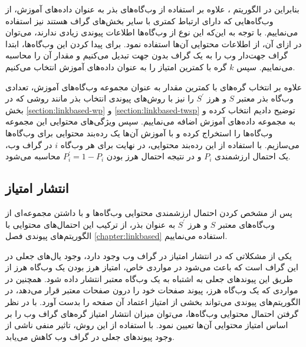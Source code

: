 \documentclass[twoside, a4paper,11pt]{book}
\numberwithin{equation}{chapter}
\numberwithin{table}{chapter}
\numberwithin{figure}{chapter}
\numberwithin{equation}{chapter}
\begin{document}
بنابراین در الگوریتم ، علاوه بر استفاده از وب‌گاه‌های بذر به عنوان داده‌های آموزش، از وب‌گاه‌هایی که دارای ارتباط کمتری با سایر بخش‌های گراف هستند نیز استفاده می‌نماییم. با توجه به این‌که این نوع از وب‌گاه‌ها اطلاعات پیوندی زیادی ندارند، می‌توان در ازای آن، از اطلاعات محتوایی آن‌ها استفاده نمود. برای پیدا کردن این وب‌گاه‌ها، ابتدا گراف جهت‌دار وب را به یک گراف بدون جهت تبدیل می‌کنیم و مقدار  آن را محاسبه می‌نماییم. سپس $k$ گره با کمترین امتیاز را به عنوان داده‌های آموزش انتخاب می‌کنیم. 

علاوه بر انتخاب گره‌های با کمترین مقدار  به عنوان مجموعه وب‌گاه‌های آموزش، تعدادی وب‌گاه‌ بذر معتبر $S$ و هرز $S^\prime$ را نیز با روش‌‌های پیوندی انتخاب بذر مانند روشی که در بخش \ref{section:linkbased-wp} و \ref{section:linkbased-twsp} توضیح دادیم انتخاب کرده و به مجموعه داده‌های آموزش اضافه می‌نماییم. سپس ویژگی‌های محتوایی این مجموعه وب‌گاه‌ها را استخراج کرده و با آموزش آن‌ها یک رده‌بند محتوایی برای وب‌گاه‌ها می‌سازیم. با استفاده از این رده‌بند محتوایی، در نهایت برای هر وب‌گاه‌ $i$ در گراف وب، یک احتمال ارزشمندی $P_i$ و در نتیجه احتمال هرز بودن $P^\prime_i = 1-P_i$  محاسبه می‌شود.

\subsection{انتشار امتیاز}
\label{section:contentandlinkbased-propagate}
پس از مشخص کردن احتمال ارزشمندی محتوایی وب‌گاه‌ها و با داشتن مجموعه‌ای از وب‌گاه‌های معتبر $S$ و هرز $S^\prime$ به عنوان بذر، از ترکیب این احتمال‌های محتوایی با الگوریتم‌های پیوندی فصل \ref{chapter:ٍlinkbased} استفاده می‌نماییم.
 
یکی از مشکلاتی که در انتشار امتیاز در گراف وب وجود دارد، وجود یال‌های جعلی در این گراف است که باعث می‌شود در مواردی خاص، امتیاز  هرز  بودن یک وب‌گاه هرز از طریق این پیوندهای جعلی به اشتباه به یک وب‌گاه معتبر انتشار داده شود. همچنین در مواردی که یک وب‌گاه هرز، پیوند صفحات خود را درون صفحات معتبر قرار می‌دهد، در الگوریتم‌های پیوندی می‌تواند بخشی از امتیاز اعتماد آن صفحه را بدست آورد. با در نظر گرفتن احتمال محتوایی وب‌گاه‌ها، می‌توان میزان انتشار امتیاز گره‌های گراف وب را بر اساس امتیاز محتوایی آن‌ها تعیین نمود. با استفاده از این روش، تاثیر منفی ناشی از وجود پیوندهای جعلی در گراف وب کاهش می‌یابد. 
\end{document}
